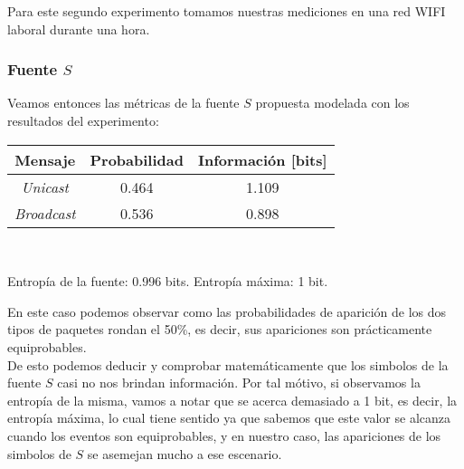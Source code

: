 \par Para este segundo experimento tomamos nuestras mediciones en una red WIFI laboral durante una hora.

\subsubsection{Fuente $S$}

\par Veamos entonces las m\'etricas de la fuente $S$ propuesta modelada con los resultados del experimento: \\

\begin{tabular}{ | c | c | c |}
    \hline
    Mensaje & Probabilidad & Información [bits] \\
    \hline
    \textit{Unicast} & 0.464 & 1.109 \\
    \hline
    \textit{Broadcast} & 0.536 & 0.898 \\
    \hline
\end{tabular} \\

\par Entropía de la fuente: 0.996 bits. Entropía máxima: 1 bit.

\par En este caso podemos observar como las probabilidades de aparici\'on de los dos tipos de paquetes rondan el 50\%, es decir, sus apariciones son pr\'acticamente equiprobables. \\
De esto podemos deducir y comprobar matem\'aticamente que los simbolos de la fuente $S$ casi no nos brindan informaci\'on. Por tal m\'otivo, si observamos la entrop\'ia de la misma, vamos a notar que se acerca demasiado a 1 bit, es decir, la entrop\'ia m\'axima, lo cual tiene sentido ya que sabemos que este valor se alcanza cuando los eventos son equiprobables, y en nuestro caso, las apariciones de los simbolos de $S$ se asemejan mucho a ese escenario.